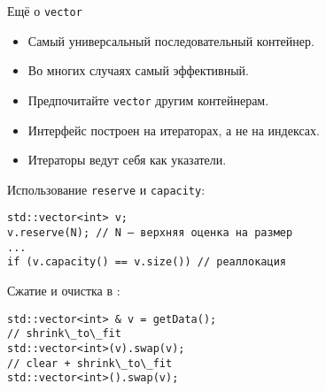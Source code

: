 \documentclass{beamer}
\begin{document}
\begin{frame}[fragile]{Ещё о {\tt vector}}
\small\setlength{\baselineskip}{0.6em}
 \begin{itemize}
     \item 	Самый универсальный последовательный контейнер. 

     \item Во многих случаях самый эффективный.
         
     \item Предпочитайте \texttt{vector} другим контейнерам.
 
     \item Интерфейс построен на итераторах, а не на индексах.
 
     \item Итераторы ведут себя как указатели.
\end{itemize}

\medskip
Использование {\tt reserve} и {\tt capacity}:
    \begin{lstlisting}
std::vector<int> v;
v.reserve(N); // N — верхняя оценка на размер
...
if (v.capacity() == v.size()) // реаллокация
    \end{lstlisting}

Сжатие и очистка в \langcpp[03]:
    \begin{lstlisting}
std::vector<int> & v = getData();
// shrink\_to\_fit
std::vector<int>(v).swap(v); 
// clear + shrink\_to\_fit 
std::vector<int>().swap(v);
    \end{lstlisting}

\medskip

\end{frame}
\end{document}
